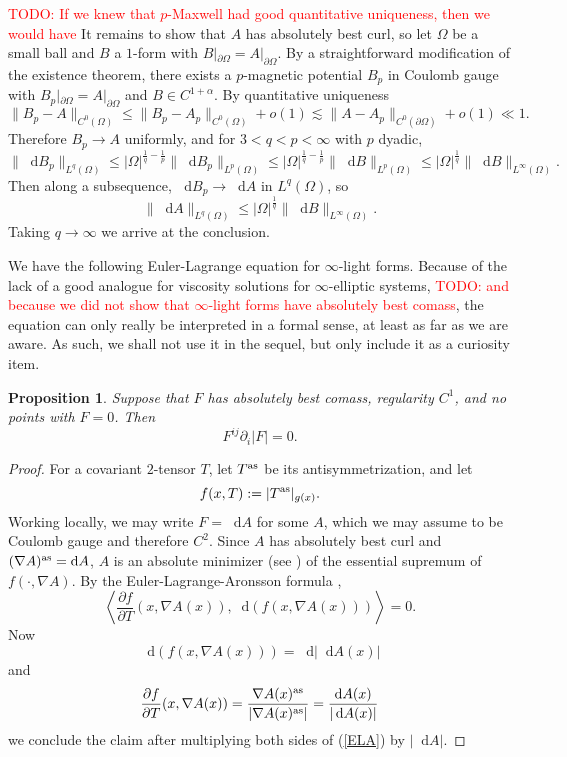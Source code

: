 \documentclass[reqno,11pt]{amsart}
\newcommand*\dif{\mathop{}\!\mathrm{d}}
\newtheorem{proposition}[theorem]{Proposition}
\theoremstyle{definition}
\numberwithin{equation}{section}
\newcommand\todo[1]{\textcolor{red}{TODO: #1}}
\begin{document}
\todo{If we knew that $p$-Maxwell had good quantitative uniqueness, then we would have}
It remains to show that $A$ has absolutely best curl, so let $\Omega$ be a small ball and $B$ a $1$-form with $B|_{\partial \Omega} = A|_{\partial \Omega}$.
By a straightforward modification of the existence theorem, there exists a $p$-magnetic potential $B_p$ in Coulomb gauge with $B_p|_{\partial \Omega} = A|_{\partial \Omega}$ and $B \in C^{1 + \alpha}$.
By quantitative uniqueness
$$\|B_p - A\|_{C^0(\Omega)} \leq \|B_p - A_p\|_{C^0(\Omega)} + o(1) \lesssim \|A - A_p\|_{C^0(\partial \Omega)} + o(1) \ll 1.$$
Therefore $B_p \to A$ uniformly, and for $3 < q < p < \infty$ with $p$ dyadic,
$$\|\dif B_p\|_{L^q(\Omega)} \leq |\Omega|^{\frac{1}{q} -\frac{1}{p}} \|\dif B_p\|_{L^p(\Omega)} \leq |\Omega|^{\frac{1}{q} -\frac{1}{p}} \|\dif B\|_{L^p(\Omega)} \leq |\Omega|^{\frac{1}{q}} \|\dif B\|_{L^\infty(\Omega)}.$$
Then along a subsequence, $\dif B_p \to \dif A$ in $L^q(\Omega)$, so 
$$\|\dif A\|_{L^q(\Omega)} \leq |\Omega|^{\frac{1}{q}} \|\dif B\|_{L^\infty(\Omega)}.$$
Taking $q \to \infty$ we arrive at the conclusion.

We have the following Euler-Lagrange equation for $\infty$-light forms.
Because of the lack of a good analogue for viscosity solutions for $\infty$-elliptic systems, \todo{and because we did not show that $\infty$-light forms have absolutely best comass}, the equation can only really be interpreted in a formal sense, at least as far as we are aware.
As such, we shall not use it in the sequel, but only include it as a curiosity item.

\begin{proposition}
Suppose that $F$ has absolutely best comass, regularity $C^1$, and no points with $F = 0$. Then
\begin{equation}\label{infinityMaxwell}
	F^{ij} \partial_i |F| = 0.
\end{equation}
\end{proposition}
\begin{proof}
For a covariant $2$-tensor $T$, let $T^{\rm as}$ be its antisymmetrization, and let
$$f(x, T) := |T^{\rm as}|_{g(x)}.$$
Working locally, we may write $F = \dif A$ for some $A$, which we may assume to be Coulomb gauge and therefore $C^2$.
Since $A$ has absolutely best curl and $(\nabla A)^{\rm as} = \dif A$, $A$ is an absolute minimizer (see \cite[Definition 5.1]{Barron2001}) of the essential supremum of $f(\cdot, \nabla A)$.
By the Euler-Lagrange-Aronsson formula \cite[Theorem 5.2]{Barron2001},
\begin{equation}\label{ELA}
	\left\langle \frac{\partial f}{\partial T}(x, \nabla A(x)), \dif (f(x, \nabla A(x))) \right\rangle = 0.
\end{equation}
Now
$$\dif(f(x, \nabla A(x))) = \dif |\dif A(x)|$$
and 
$$\frac{\partial f}{\partial T}(x, \nabla A(x)) = \frac{\nabla A(x)^{\rm as}}{|\nabla A(x)^{\rm as}|} = \frac{\dif A(x)}{|\dif A(x)|}$$
we conclude the claim after multiplying both sides of (\ref{ELA}) by $|\dif A|$.
\end{proof}
\end{document}
